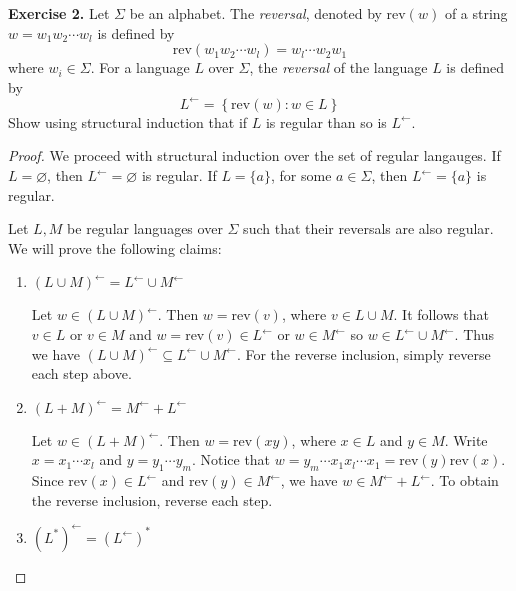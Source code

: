 \documentclass[11pt]{article}
\begin{document}
    \newpage
    \textbf{Exercise 2.} Let \(\Sigma\) be an alphabet. The \textit{reversal}, denoted by \(\mathrm{rev} (w)\) of a string \(w = w_1 w_2 \cdots w_l\) is defined by
    \[
        \mathrm{rev} (w_1 w_2 \cdots w_l) = w_l \cdots w_2 w_1
    \]
    where \(w_i \in \Sigma\). For a language \(L\) over \(\Sigma\), the \textit{reversal} of the language \(L\) is defined by
    \[
        L^{\leftarrow} = \left\{ \mathrm{rev} (w) : w \in L \right\}
    \]
    Show using structural induction that if \(L\) is regular than so is \(L^\leftarrow\).
    \begin{proof}
        We proceed with structural induction over the set of regular langauges. If \(L = \varnothing\), then \(L^\leftarrow = \varnothing\) is regular. If \(L = \{ a \}\), for some \(a \in \Sigma\), then \(L^\leftarrow = \{ a \}\) is regular.

        \medskip

        \noindent Let \(L,M\) be regular languages over \(\Sigma\) such that their reversals are also regular. We will prove the following claims:
        \begin{enumerate}[label=(\alph*)]
            \item \((L \cup M)^\leftarrow = L^\leftarrow \cup M^\leftarrow\)
            
            Let \(w \in (L \cup M)^\leftarrow\).
            Then \(w = \mathrm{rev} (v)\), where \(v \in L \cup M\). It follows that \(v \in L\) or \(v \in M\) and \(w = \mathrm{rev} (v) \in L^\leftarrow\) or \(w \in M^\leftarrow\) so \(w \in L^\leftarrow \cup M^\leftarrow\). Thus we have \((L \cup M)^\leftarrow \subseteq L^\leftarrow \cup M^\leftarrow\). For the reverse inclusion, simply reverse each step above.

            \item \((L + M)^\leftarrow = M^\leftarrow + L^\leftarrow\)
            
            Let \(w \in (L + M)^\leftarrow\). Then \(w = \mathrm{rev} (xy)\), where \(x \in L\) and \(y \in M\). Write \(x = x_1 \cdots x_l\) and \(y = y_1 \cdots y_m\). Notice that \(w = y_m \cdots x_1 x_l \cdots x_1 = \mathrm{rev} (y) \mathrm{rev} (x)\). Since \(\mathrm{rev} (x) \in L^\leftarrow\) and \(\mathrm{rev} (y) \in M^\leftarrow\), we have \(w \in M^\leftarrow + L^\leftarrow\). To obtain the reverse inclusion, reverse each step.
            \item \((L^*)^\leftarrow = (L^\leftarrow)^*\)
        \end{enumerate}
    \end{proof}
\end{document}
